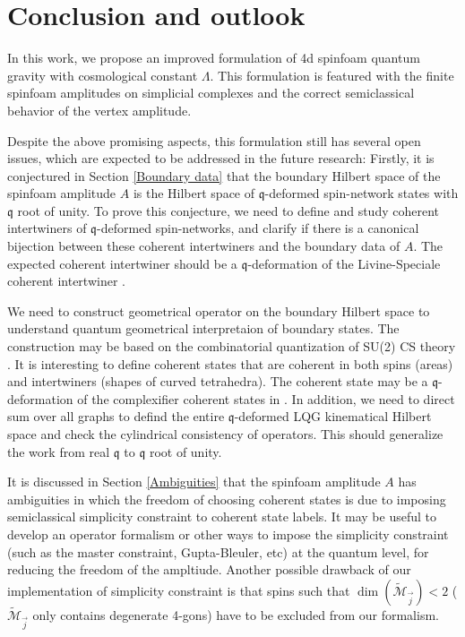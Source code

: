 \documentclass[aps,prd,notitlepage,nofootinbib,superscriptaddress,groupedaddress,twocolumn]{revtex4-1}
\newcommand{\cm}{\mathcal M}
\newcommand{\fq}{\mathfrak{q}}  \newcommand{\Fq}{\mathfrak{Q}}
\renewcommand{\L }{\Lambda}
\begin{document}
\section{Conclusion and outlook}


In this work, we propose an improved formulation of 4d spinfoam quantum gravity with cosmological constant $\L$. This formulation is featured with the finite spinfoam amplitudes on simplicial complexes and the correct semiclassical behavior of the vertex amplitude. 

Despite the above promising aspects, this formulation still has several open issues, which are expected to be addressed in the future research: Firstly, it is conjectured in Section \ref{Boundary data} that the boundary Hilbert space of the spinfoam amplitude $A$ is the Hilbert space of $\fq$-deformed spin-network states with $\fq$ root of unity. To prove this conjecture, we need to define and study coherent intertwiners of $\fq$-deformed spin-networks, and clarify if there is a canonical bijection between these coherent intertwiners and the boundary data of $A$. The expected coherent intertwiner should be a $\fq$-deformation of the Livine-Speciale coherent intertwiner \cite{LS}. 

We need to construct geometrical operator on the boundary Hilbert space to understand quantum geometrical interpretaion of boundary states. The construction may be based on the combinatorial quantization of SU(2) CS theory \cite{Alekseev:1994pa,Alekseev:1994au}. It is interesting to define coherent states that are coherent in both spins (areas) and intertwiners (shapes of curved tetrahedra). The coherent state may be a $\fq$-deformation of the complexifier coherent states in \cite{Thiemann:2000bw}. In addition, we need to direct sum over all graphs to defind the entire $\fq$-deformed LQG kinematical Hilbert space and check the cylindrical consistency of operators. This should generalize the work \cite{Lewandowski:2008ye} from real $\fq$ to $\fq$ root of unity.
 

It is discussed in Section \ref{Ambiguities} that the spinfoam amplitude $A$ has ambiguities in which the freedom of choosing coherent states is due to imposing semiclassical simplicity constraint to coherent state labels. It may be useful to develop an operator formalism or other ways to impose the simplicity constraint (such as the master constraint, Gupta-Bleuler, etc) at the quantum level, for reducing the freedom of the ampltiude. Another possible drawback of our implementation of simplicity constraint is that spins such that $\dim(\widetilde{\cm}_{\vec j})<2$ ($\widetilde{\cm}_{\vec j}$ only contains degenerate 4-gons) have to be excluded from our formalism.   
 
\end{document}
